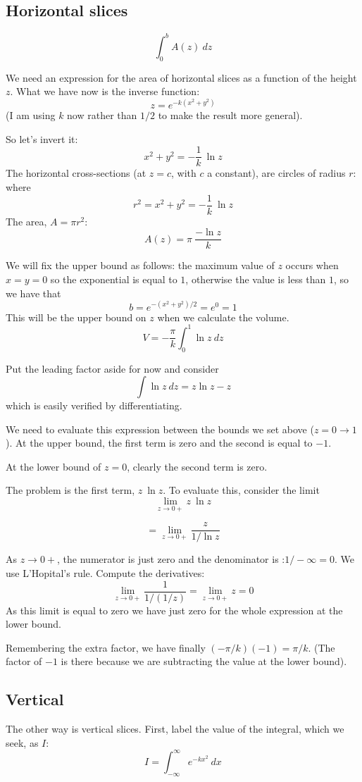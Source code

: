 \documentclass[11pt, oneside]{article}   	%
\begin{document}
\subsection*{Horizontal slices}
\[ \int_0^b A(z) \ dz \]

We need an expression for the area of horizontal slices as a function of the height $z$.  What we have now is the inverse function:
\[ z = e^{-k(x^2 + y^2)} \]
(I am using $k$ now rather than $1/2$ to make the result more general).

So let's invert it:
\[ x^2 + y^2 = -\frac{1}{k} \ \ln z \]
The horizontal cross-sections (at $z = c$, with $c$ a constant), are circles of radius $r$: where
\[ r^2 = x^2 + y^2 = -\frac{1}{k} \ \ln z \]
The area, $A = \pi r^2$:
\[ A(z) = \pi \ \frac{- \ln z}{k}  \]

We will fix the upper bound as follows:  the maximum value of $z$ occurs when $x=y=0$ so the exponential is equal to $1$, otherwise the value is less than $1$, so we have that 
\[  b = e^{-(x^2 + y^2)/2} = e^0 = 1 \]
This will be the upper bound on $z$ when we calculate the volume.
\[ V = -\frac{\pi}{k} \int_0^1 \ln z \ dz \]

Put the leading factor aside for now and consider
\[ \int \ln z \ dz = z \ln z - z \]
which is easily verified by differentiating.

We need to evaluate this expression between the bounds we set above ($z=0 \rightarrow 1$).  At the upper bound, the first term is zero and the second is equal to $-1$.

At the lower bound of $z=0$, clearly the second term is zero.
  
The problem is the first term, $z \ \ln z$.  To evaluate this, consider the limit
\[ \lim_{z \rightarrow 0+}  z \ \ln z  \]
 
\[ = \lim_{z \rightarrow 0+}   \frac{z}{1/\ln z} \]

As $z \rightarrow 0+$, the numerator is just zero and the denominator is :$1/-\infty = 0$.  We use L'Hopital's rule.  Compute the derivatives:
\[ \lim_{z \rightarrow 0+} \frac{1}{1/(1/z)} = \lim_{z \rightarrow 0+} z = 0 \]
As this limit is equal to zero we have just zero for the whole expression at the lower bound.

Remembering the extra factor, we have finally $(-\pi/k)(-1) = \pi/k$.  (The factor of $-1$ is there because we are subtracting the value at the lower bound).

\subsection*{Vertical}
The other way is vertical slices.  First, label the value of the integral, which we seek, as $I$:
\[ I = \int_{-\infty}^{\infty} e^{-kx^2} \ dx \]
\end{document}
